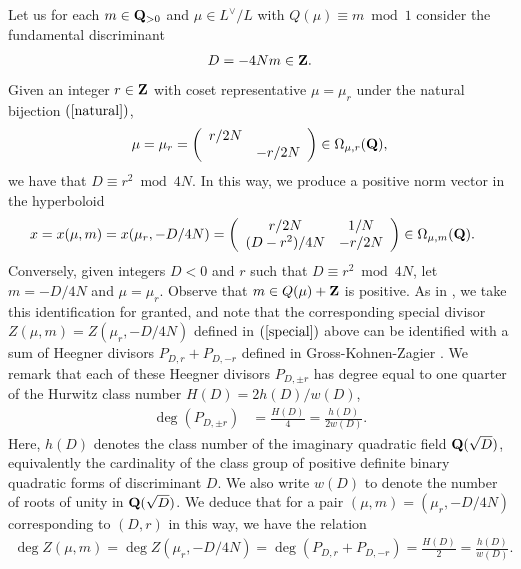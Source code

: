 \documentclass{amsart}
\theoremstyle{definition}
\theoremstyle{definition}
\theoremstyle{definition}
\begin{document}
Let us for each $m \in {\bf{Q}}_{>0}$ and $\mu \in L^{\vee}/L$ with $Q(\mu) \equiv m \bmod 1$ consider the fundamental discriminant 
\begin{align*} D = -4N m \in {\bf{Z}}. \end{align*} 
Given an integer $r \in {\bf{Z}}$ with coset representative $\mu = \mu_r$ under the natural bijection $(\ref{natural})$,
\begin{align*} \mu = \mu_r = \left( \begin{array}{cc} r/2N & ~~\\ ~~& -r/2N \end{array}  \right) \in \Omega_{\mu, r}({\bf{Q}}), \end{align*}
we have that $D \equiv r^2 \bmod 4N$. In this way, we produce a positive norm vector in the hyperboloid
\begin{align}\label{x} x = x(\mu, m) = x(\mu_r, -D/4N) 
&= \left( \begin{array}{cc} r/2N & 1/N \\ (D - r^2)/4N & - r/2N \end{array} \right) \in \Omega_{\mu, m}({\bf{Q}}). \end{align}
Conversely, given integers $D < 0$ and $r$ such that $D \equiv r^2 \bmod 4N$, let $m  = -D /4N$ and $\mu = \mu_r$. 
Observe that $m \in Q(\mu) + {\bf{Z}}$ is positive. As in \cite[$\S$7.1]{BY}, we take this identification for granted, 
and note that the corresponding special divisor $Z(\mu, m) = Z(\mu_r, -D/4N)$ 
defined in $(\ref{special})$ above can be identified with a sum of Heegner divisors $P_{D, r} + P_{D, -r}$ 
defined in Gross-Kohnen-Zagier \cite[IV.1(1)]{GKZ}. 
We remark that each of these Heegner divisors $P_{D, \pm r}$ has degree equal to one quarter of the Hurwitz class number $H(D) = 2h(D)/w(D)$,
\begin{align*} \deg (P_{D, \pm r}) &= \frac{H(D)}{4} = \frac{h(D)}{2w(D)}. \end{align*}
Here, $h(D)$ denotes the class number of the imaginary quadratic field ${\bf{Q}}(\sqrt{D})$, equivalently the cardinality 
of the class group of positive definite binary quadratic forms of discriminant $D$. 
We also write $w(D)$ to denote the number of roots of unity in ${\bf{Q}}(\sqrt{D})$. 
We deduce that for a pair $(\mu, m) = (\mu_r, -D/4N)$ corresponding to $(D, r)$ in this way, we have the relation 
\begin{align*} \deg Z(\mu, m)  = \deg Z(\mu_r, -D/4N) = \deg(P_{D, r} + P_{D, -r}) = \frac{H(D)}{2} = \frac{h(D)}{w(D)}. \end{align*} 
\end{document}
